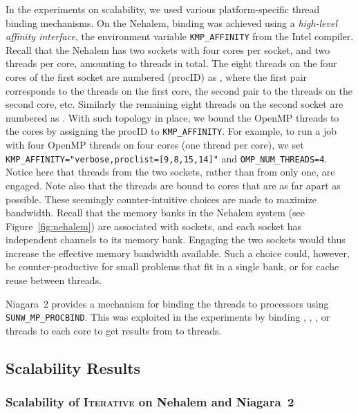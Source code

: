 \documentclass{article}
\begin{document}
In the experiments on scalability, we used various platform-specific thread binding mechanisms.    
On the Nehalem, binding  was achieved using a {\em high-level affinity interface},
the environment variable \texttt{KMP\_AFFINITY} from the Intel compiler. 
Recall that the Nehalem has two sockets with four cores per socket, and
two threads per core, amounting to  threads in total. 
The eight threads on the four cores of the first socket are
numbered (procID) as 
, 
where the first pair corresponds to the threads
on the first core, the second pair to the threads on the second core, etc.
Similarly the remaining eight  threads on the second socket are numbered as
 .
With such topology in place, we bound the OpenMP threads to the cores by
assigning the procID to \texttt{KMP\_AFFINITY}. For example, 
to run a job with four OpenMP threads on four cores (one thread per core), we set \\
 \texttt{KMP\_AFFINITY="verbose,proclist=[9,8,15,14]"} 
and \texttt{OMP\_NUM\_THREADS=4}.\\
Notice here that threads from the two sockets, rather than from
only one, are engaged. Note also that the threads are bound to cores that are as far apart as possible.
These seemingly counter-intuitive choices are made to maximize bandwidth.
Recall that the memory banks in the Nehalem system (see Figure~\ref{fig:nehalem}) 
are associated with sockets, and each socket has independent channels to its memory bank. 
Engaging the two sockets would thus increase the effective memory bandwidth available. 
Such a choice could, however, be counter-productive for small problems that fit in a single bank, 
or for cache reuse between threads. 

Niagara~2 provides a mechanism for binding the threads to processors using
\texttt{SUNW\_MP\_PROCBIND}. This was exploited in the experiments by
binding , , , or  threads to each core to get results from  to  threads. 

\subsection{Scalability Results}
\label{sec:scalability-sep}

\subsubsection{Scalability of \textsc{Iterative} on Nehalem and Niagara~2}
\end{document}
